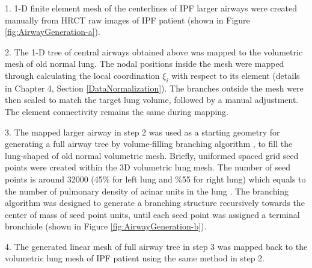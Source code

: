 1. 1-D finite element mesh of the centerlines of IPF larger airways were created manually from HRCT raw images of IPF patient (shown in Figure \ref{fig:AirwayGeneration-a}).

2. The 1-D tree of central airways obtained above was mapped to the volumetric mesh of old normal lung. The nodal positions inside the mesh were mapped through calculating the local coordination $\xi_{i}$ with respect to its element (details in Chapter 4, Section \ref{DataNormalization}). The branches outside the mesh were then scaled to match the target lung volume, followed by a manual adjustment. The element connectivity remains the same during mapping.

3. The mapped larger airway in step 2 was used as a starting geometry for generating a full airway tree by volume-filling branching algorithm \citep{tawhai2000generation, tawhai2004ct}, to fill the lung-shaped of old normal volumetric mesh. Briefly, uniformed spaced grid seed points were created within the 3D volumetric lung mesh. The number of seed points is around 32000 (45\% for left lung and \%55 for right lung) which equals to the number of pulmonary density of acinar units in the lung \citep{haefeli1988morphometry}. The branching algorithm was designed to generate a branching structure recursively towards the center of mass of seed point units, until each seed point was assigned a terminal bronchiole (shown in Figure \ref{fig:AirwayGeneration-b}). 

4. The generated linear mesh of full airway tree in step 3 was mapped back to the volumetric lung mesh of IPF patient using the same method in step 2.

